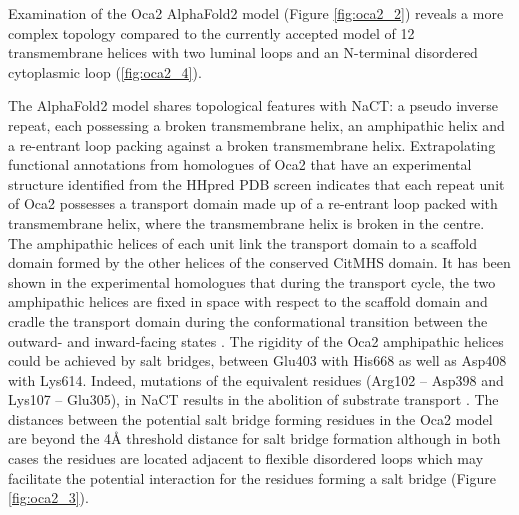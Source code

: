 Examination of the Oca2 AlphaFold2 model (Figure \ref{fig:oca2_2}) reveals a more complex topology compared to the currently accepted model of 12 transmembrane helices with two luminal loops and an N-terminal disordered cytoplasmic loop (\ref{fig:oca2_4}).

 The AlphaFold2 model shares topological features with NaCT: a pseudo inverse repeat, each possessing a broken transmembrane helix, an amphipathic helix and a re-entrant loop packing against a broken transmembrane helix.  Extrapolating functional annotations from homologues of Oca2 that have an experimental structure identified from the HHpred PDB screen indicates that each repeat unit of Oca2 possesses a transport domain made up of a re-entrant loop packed with transmembrane helix, where the transmembrane helix is broken in the centre. The amphipathic helices of each unit link the transport domain to a scaffold domain formed by the other helices of the conserved CitMHS domain. It has been shown in the experimental homologues that during the transport cycle, the two amphipathic helices are fixed in space with respect to the scaffold domain and cradle the transport domain during the conformational transition between the outward- and inward-facing states \cite{drew2016shared,sauer2020structural}. The rigidity of the Oca2 amphipathic helices could be achieved by salt bridges, between Glu403 with His668 as well as Asp408 with Lys614. Indeed, mutations of the equivalent residues (Arg102 – Asp398 and Lys107 – Glu305), in NaCT results in the abolition of substrate transport \cite{sauer2021structure}.  The distances between the potential salt bridge forming residues in the Oca2 model are beyond the 4Å threshold distance for salt bridge formation although in both cases the residues are located adjacent to flexible disordered loops which may facilitate the potential interaction for the residues forming a salt bridge (Figure \ref{fig:oca2_3}).  

